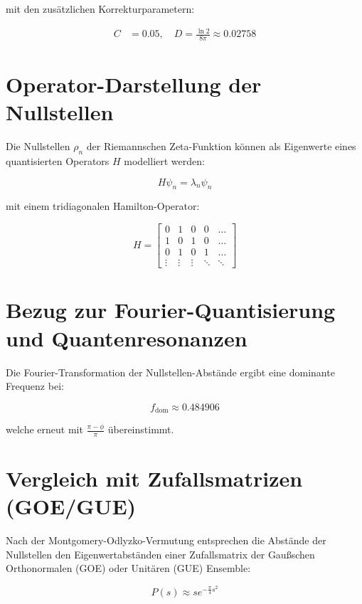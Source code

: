 \documentclass[a4paper,12pt]{article}
\begin{document}
mit den zusätzlichen Korrekturparametern:

\begin{align*}
C &= 0.05, \quad D = \frac{\ln 2}{8\pi} \approx 0.02758
\end{align*}

\section{Operator-Darstellung der Nullstellen}
Die Nullstellen \( \rho_n \) der Riemannschen Zeta-Funktion können als Eigenwerte eines quantisierten Operators \( H \) modelliert werden:

\begin{equation}
H \psi_n = \lambda_n \psi_n
\end{equation}

mit einem tridiagonalen Hamilton-Operator:

\begin{equation}
H = \begin{bmatrix}
0 & 1 & 0 & 0 & \dots \\
1 & 0 & 1 & 0 & \dots \\
0 & 1 & 0 & 1 & \dots \\
\vdots & \vdots & \vdots & \ddots & \ddots
\end{bmatrix}
\end{equation}

\section{Bezug zur Fourier-Quantisierung und Quantenresonanzen}
Die Fourier-Transformation der Nullstellen-Abstände ergibt eine dominante Frequenz bei:

\begin{equation}
f_{\text{dom}} \approx 0.484906
\end{equation}

welche erneut mit \( \frac{\pi - \phi}{\pi} \) übereinstimmt.

\section{Vergleich mit Zufallsmatrizen (GOE/GUE)}
Nach der Montgomery-Odlyzko-Vermutung entsprechen die Abstände der Nullstellen den Eigenwertabständen einer Zufallsmatrix der Gaußschen Orthonormalen (GOE) oder Unitären (GUE) Ensemble:

\begin{equation}
P(s) \approx s e^{-\frac{\pi}{4} s^2}
\end{equation}
\end{document}
